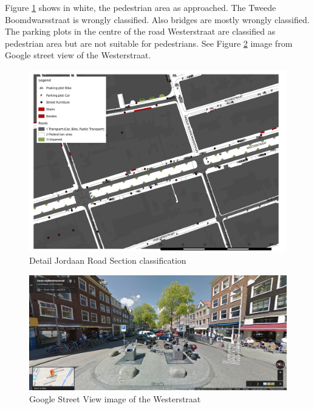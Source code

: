 Figure \ref{jordaanroad} shows in white, the pedestrian area as approached. The Tweede Boomdwarsstraat is wrongly classified. Also bridges are mostly wrongly classified. The parking plots in the centre of the road Westerstraat are classified as pedestrian area but are not suitable for pedestrians. See Figure \ref{westerstraat} image from Google street view of the Westerstraat. 

\begin{figure}[h]
\includegraphics[width=\textwidth]{img/R_Jordaan_weg_detail_resultat.pdf}
\centering
\caption{
Detail Jordaan Road Section classification\label{jordaanroad}}
\end{figure} 

\begin{figure}[h]
\includegraphics[width=\textwidth]{img/R_Westerstraat.png}
\centering
\caption{
Google Street View image of the Westerstraat\label{westerstraat}}
\end{figure} 


\clearpage

